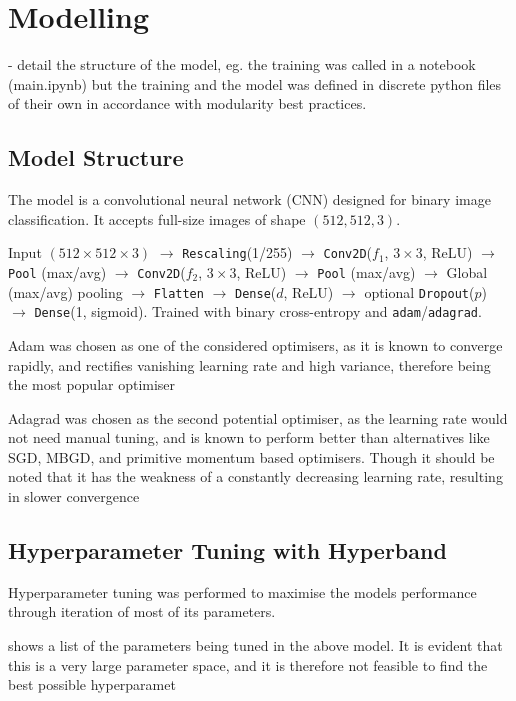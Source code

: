 \section{Modelling}

- detail the structure of the model, eg. the training was called in a notebook (main.ipynb) but the training and the model was defined in discrete python files of their own in accordance with modularity best practices.

\subsection{Model Structure}

The model is a convolutional neural network (CNN) designed for binary image classification. It accepts full-size images of shape $(512, 512, 3)$.

Input $(512\times 512\times 3)$ $\rightarrow$ \texttt{Rescaling}(1/255) $\rightarrow$ 
\texttt{Conv2D}($f_1$, $3{\times}3$, ReLU) $\rightarrow$ \texttt{Pool} (max/avg) $\rightarrow$
\texttt{Conv2D}($f_2$, $3{\times}3$, ReLU) $\rightarrow$ \texttt{Pool} (max/avg) $\rightarrow$
Global (max/avg) pooling $\rightarrow$ \texttt{Flatten} $\rightarrow$
\texttt{Dense}($d$, ReLU) $\rightarrow$ optional \texttt{Dropout}($p$) $\rightarrow$
\texttt{Dense}(1, sigmoid). Trained with binary cross-entropy and \texttt{adam}/\texttt{adagrad}.

Adam was chosen as one of the considered optimisers, as it is known to converge rapidly, and rectifies vanishing learning rate and high variance, therefore being the most popular optimiser \cite{RAIAAN2024100470}

Adagrad was chosen as the second potential optimiser, as the learning rate would not need manual tuning, and is known to perform better than alternatives like SGD, MBGD, and primitive momentum based optimisers. Though it should be noted that it has the weakness of a constantly decreasing learning rate, resulting in slower convergence \cite{RAIAAN2024100470}

\subsection{Hyperparameter Tuning with Hyperband}

Hyperparameter tuning was performed to maximise the models performance through iteration of most of its parameters. 

 shows a list of the parameters being tuned in the above model. It is evident that this is a very large parameter space, and it is therefore not feasible to find the best possible hyperparamet

